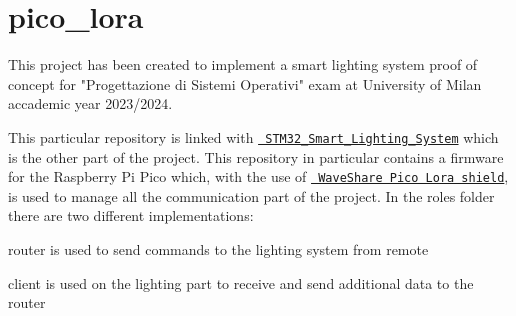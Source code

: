 \chapter{pico\+\_\+lora}
\hypertarget{index}{}\label{index}
\label{index_md_README}%
%
This project has been created to implement a smart lighting system proof of concept for "{}\+Progettazione di Sistemi Operativi"{} exam at University of Milan accademic year 2023/2024.

This particular repository is linked with \href{https://github.com/sioel0/STM32_Smart_Lighting_System}{\texttt{ STM32\+\_\+\+Smart\+\_\+\+Lighting\+\_\+\+System}} which is the other part of the project. This repository in particular contains a firmware for the Raspberry Pi Pico which, with the use of \href{https://www.waveshare.com/wiki/Pico-LoRa-SX1262}{\texttt{ Wave\+Share Pico Lora shield}}, is used to manage all the communication part of the project. In the roles folder there are two different implementations\+:
\begin{DoxyItemize}
\item router is used to send commands to the lighting system from remote
\item client is used on the lighting part to receive and send additional data to the router 
\end{DoxyItemize}